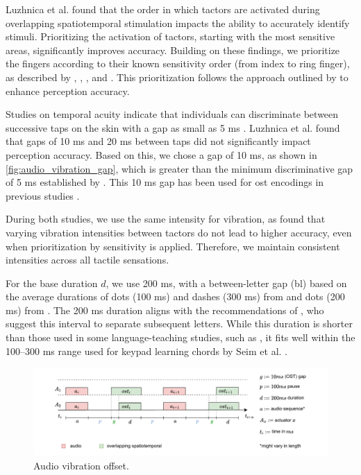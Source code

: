 Luzhnica et al. \cite{Luzhnica2017} found that the order in which tactors are activated during overlapping spatiotemporal stimulation impacts the ability to accurately identify stimuli. Prioritizing the activation of tactors, starting with the most sensitive areas, significantly improves accuracy. Building on these findings, we prioritize the fingers according to their known sensitivity order (from index to ring finger), as described by \cite{Luzhnica2017}, \cite{Hoggan2007}, \cite{VegaBermudez2001}, and \cite{Duncan2007}. This prioritization follows the approach outlined by \cite{Luzhnica2017} to enhance perception accuracy.

Studies on temporal acuity indicate that individuals can discriminate between successive taps on the skin with a gap as small as 5 ms \cite{Luzhnica2017, Katz2013}. Luzhnica et al. found that gaps of 10 ms and 20 ms between taps did not significantly impact perception accuracy. Based on this, we chose a gap of 10 ms, as shown in \autoref{fig:audio_vibration_gap}, which is greater than the minimum discriminative gap of 5 ms established by \cite{Luzhnica2017}. This 10 ms gap has been used for \gls{ost} encodings in previous studies \cite{Luzhnica2018, Luzhnica2016}.

During both studies, we use the same intensity for vibration, as \cite{Luzhnica2017} found that varying vibration intensities between tactors do not lead to higher accuracy, even when prioritization by sensitivity is applied. Therefore, we maintain consistent intensities across all tactile sensations.

For the base duration $d$, we use 200 ms, with a between-letter gap (bl) based on the average durations of dots (100 ms) and dashes (300 ms) from \cite{Seim2018} and dots (200 ms) from \cite{Pescara2019}. The 200 ms duration aligns with the recommendations of \cite{Luzhnica2018}, who suggest this interval to separate subsequent letters. While this duration is shorter than those used in some language-teaching studies, such as \cite{Seim2014a}, it fits well within the 100–300 ms range used for keypad learning chords by Seim et al. \cite{Seim2017}.

\begin{figure}
    \centering
    \includegraphics[width=\linewidth]{src/pictures/audio_vibration_diagram.drawio.pdf}
    \caption{Audio vibration offset.}
    \label{fig:audio_vibration_gap}
\end{figure}

